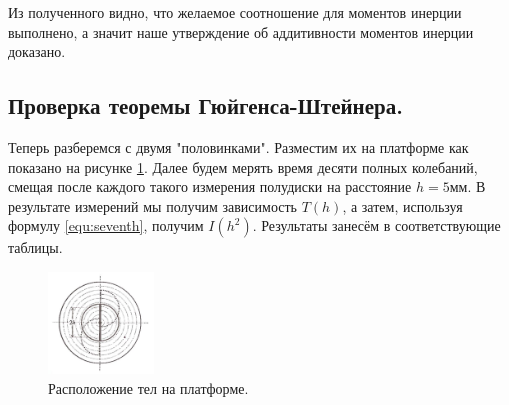 \documentclass[12pt,a4paper]{article}
\begin{document}
\par Из полученного видно, что желаемое соотношение для моментов инерции выполнено, а значит наше утверждение об аддитивности моментов инерции доказано.

\subsection{Проверка теоремы Гюйгенса-Штейнера.}
Теперь разберемся с двумя "половинками". Разместим их на платформе как показано на рисунке \ref{ris:position}. Далее будем мерять время десяти полных колебаний, смещая после каждого такого измерения полудиски на расстояние $h=5$мм. В результате измерений мы получим зависимость $T(h)$, а затем, используя формулу \ref{equ:seventh}, получим $I(h^2)$. Результаты занесём в соответствующие таблицы.
	    \begin{figure}
			\vspace{-3em}
			\includegraphics[width=0.25\textwidth]{position.jpg}
			\caption{Расположение тел на платформе.}
			\label{ris:position}
		\end{figure}	
\end{document}
